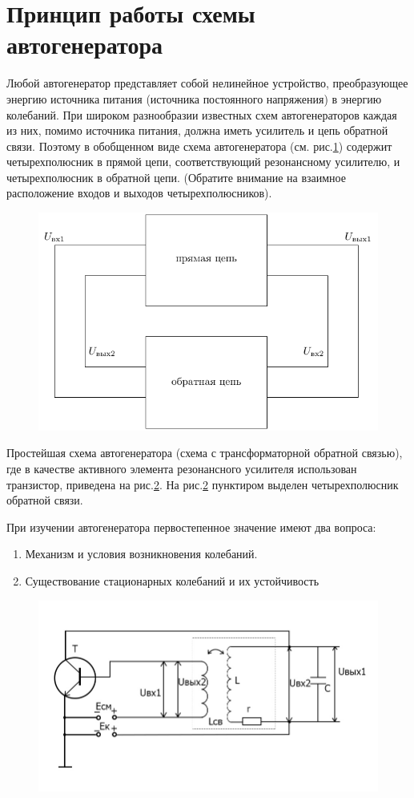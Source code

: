 \section{Принцип работы схемы автогенератора}
Любой автогенератор представляет собой нелинейное устройство, преобразующее энергию источника питания (источника постоянного напряжения) в энергию колебаний. При широком разнообразии известных схем автогенераторов каждая из них, помимо источника питания, должна иметь усилитель и цепь обратной связи. Поэтому в обобщенном виде схема автогенератора (см. рис.\ref{fig:fig1}) содержит четырехполюсник в прямой цепи, соответствующий резонансному усилителю, и четырехполюсник в обратной цепи. (Обратите внимание на взаимное расположение входов и выходов четырехполюсников).
\begin{figure}[h]
	\centering
	\includegraphics[width=0.5\linewidth]{circuit/one.pdf}
	\caption{}
	\label{fig:fig1}
\end{figure}
Простейшая схема автогенератора (схема с трансформаторной обратной связью), где в качестве активного элемента резонансного усилителя использован транзистор, приведена на рис.\ref{fig:fig2}. На рис.\ref{fig:fig2} пунктиром выделен четырехполюсник обратной связи.

При изучении автогенератора первостепенное значение имеют два вопроса:
\begin{enumerate}
\item Механизм и условия возникновения колебаний.
\item Существование стационарных колебаний и их устойчивость
\end{enumerate}

\begin{figure}[h]
	\centering
	\includegraphics[width=0.8\linewidth]{circuit/fig2}
	\caption{}
	\label{fig:fig2}
\end{figure}

